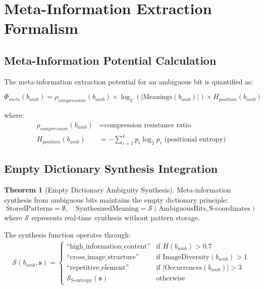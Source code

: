 \documentclass[12pt,a4paper]{article}
\theoremstyle{definition}
\newtheorem{theorem}{Theorem}
\begin{document}
\section{Meta-Information Extraction Formalism}

\subsection{Meta-Information Potential Calculation}

The meta-information extraction potential for an ambiguous bit is quantified as:

\begin{equation}
\Phi_{meta}(b_{amb}) = \rho_{compression}(b_{amb}) \times \log_2(|\text{Meanings}(b_{amb})|) \times H_{position}(b_{amb})
\end{equation}

where:
\begin{align}
\rho_{compression}(b_{amb}) &= \text{compression resistance ratio} \\
H_{position}(b_{amb}) &= -\sum_{i=1}^{k} p_i \log_2 p_i \text{ (positional entropy)}
\end{align}

\subsection{Empty Dictionary Synthesis Integration}

\begin{theorem}[Empty Dictionary Ambiguity Synthesis]
Meta-information synthesis from ambiguous bits maintains the empty dictionary principle:
\begin{equation}
\text{StoredPatterns} = \emptyset, \quad \text{SynthesizedMeaning} = \mathcal{S}(\text{AmbiguousBits}, \text{S-coordinates})
\end{equation}
where $\mathcal{S}$ represents real-time synthesis without pattern storage.
\end{theorem}

The synthesis function operates through:
\begin{align}
\mathcal{S}(b_{amb}, \mathbf{s}) = \begin{cases}
\text{``high\_information\_content''} & \text{if } H(b_{amb}) > 0.7 \\
\text{``cross\_image\_structure''} & \text{if } \text{ImageDiversity}(b_{amb}) > 1 \\
\text{``repetitive\_element''} & \text{if } |\text{Occurrences}(b_{amb})| > 3 \\
\mathcal{S}_{\text{S-entropy}}(\mathbf{s}) & \text{otherwise}
\end{cases}
\end{align}
\end{document}
